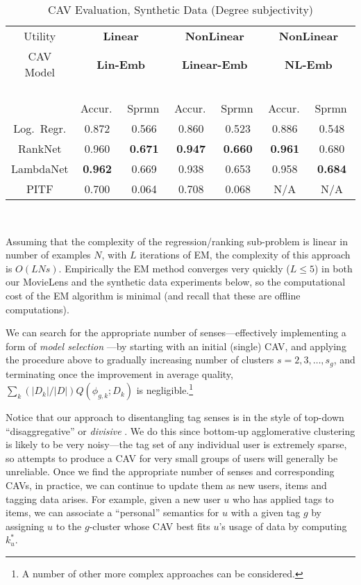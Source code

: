 \documentclass[manuscript,screen,nonacm]{acmart}
\newcommand{\1}{{\mathbf 1}}
\theoremstyle{TheoremNum}
\begin{document}
\begin{table}[t]
  \centering
  {\footnotesize
  \begin{tabular}{|c||c|c|c|c|c|c|}
  \hline
Utility     & \multicolumn{2}{c|}{\textbf{Linear}} & \multicolumn{2}{c|}{\textbf{NonLinear}} & \multicolumn{2}{c|}{\textbf{NonLinear}}\\     
CAV Model & \multicolumn{2}{c|}{\textbf{Lin-Emb}} & \multicolumn{2}{c|}{\textbf{Linear-Emb}} & \multicolumn{2}{c|}{\textbf{NL-Emb}}\\
     & \, Accur.\, & \, Sprmn\, & \, Accur.\, & \, Sprmn\, & \, Accur.\, & \, Sprmn\, \\ \hline\hline
 Log.\ Regr. & 0.872  &	0.566 &  0.860 & 0.523	 &   0.886 & 0.548	\\ \hline
 RankNet & 0.960 & \textbf{0.671}	 &  \textbf{0.947} & \textbf{0.660}	 &  \textbf{0.961} & 0.680 \\ \hline
 LambdaNet & \textbf{0.962} & 0.669	 &  0.938 & 0.653	 &  0.958 & \textbf{0.684} \\ \hline
 PITF & 0.700 & 0.064 & 0.708 & 0.068 & N/A & N/A \\ \hline
 \end{tabular}
  } \\
  \vspace*{2mm}
  \caption{CAV Evaluation, Synthetic Data (Degree subjectivity)}
  \label{tab:subjectivity_degree}
     \vspace{-0.2in}
\end{table}

Assuming that the complexity of the regression/ranking sub-problem is linear in number of examples $N$, with $L$ iterations of EM, the complexity of this approach is $O(LNs)$.
Empirically the EM method converges very quickly ($L \leq 5$) in 
both our MovieLens and the synthetic data experiments below, so the computational cost of the EM algorithm is minimal (and recall that these are offline computations).

We can search for the appropriate number of senses---effectively implementing a form of \emph{model selection} \cite{bishop_PRML:2006}---by starting with an initial (single) CAV, and applying the procedure above to gradually increasing number of clusters $s = 2, 3, \ldots, s_g$, and terminating once the improvement in average quality, $\sum_k (|D_k|/|D|) Q(\phi_{g,k}; D_k)$ is negligible.\footnote{A number of other more complex approaches can be considered.}

Notice that our approach to disentangling tag senses is in the style of top-down ``disaggregative'' or \emph{divisive}  \cite{manning:introductionIR2008}. We do this since bottom-up agglomerative clustering \cite{manning:introductionIR2008} is likely to be very noisy---the tag set of any individual user is extremely sparse, so attempts to produce a CAV for very small groups of users will generally be unreliable. 
Once we find the appropriate number of senses and corresponding CAVs, in practice, we can continue to update them as new users, items and tagging data arises. For example, given a new user $u$ who has applied tags to items, we can associate a ``personal'' semantics for $u$ with a given tag $g$ by assigning $u$ to the $g$-cluster whose CAV best fits $u$'s usage of data by computing $k^*_u$. 
\end{document}
